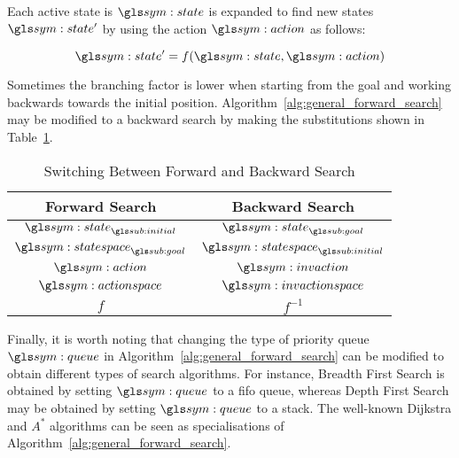 		Each active state is $\state$ is expanded to find new states $\state'$
		by using the action $\action$ as follows:

		\begin{equation}
			\state' = f(\state, \action)
		\end{equation}

		Sometimes the branching factor is lower when starting from the goal and
		working backwards towards the initial position.
		Algorithm~\ref{alg:general_forward_search} may be modified to a backward
		search by making the substitutions shown in
		Table~\ref{tab:switiching_between_forward_and_backward_search}.%


		\begin{table}[ht]
			\centering
			\begin{tabular}{c  c}
				\toprule
				Forward Search 			& Backward Search\\
				\midrule
				$\state_{\initial}$		&	$\state_{\goal}$ 			\\
				$\statespace_{\goal}$	&	$\statespace_{\initial}$	\\
				$\action$ 				&	$\invaction$				\\
				$\actionspace$ 			&	$\invactionspace$			\\
				$f$ 					&	$f^{-1}$					\\
			\end{tabular}
			\caption{Switching Between Forward and Backward Search}%
			\label{tab:switiching_between_forward_and_backward_search}
		\end{table}


		Finally, it is worth noting that changing the type of priority queue
		$\queue$ in Algorithm~\ref{alg:general_forward_search} can be modified
		to obtain different types of search algorithms. For instance, Breadth
		First Search is obtained by setting $\queue$ to a \gls{fifo} queue, whereas
		Depth First Search may be obtained by setting $\queue$ to a
		stack. The
		well-known Dijkstra and $A^*$ algorithms can be seen as specialisations
		of Algorithm~\ref{alg:general_forward_search}.

